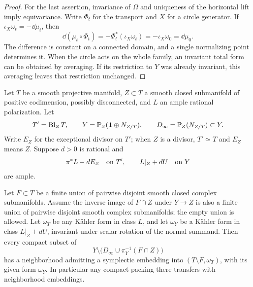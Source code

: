 \begin{proof}
For the last assertion, invariance of \(\Omega\) and uniqueness of
the horizontal lift imply equivariance. Write \(\Phi_t\) for the
transport and \(X\) for a circle generator. If
\(\iota_X\omega_t=-\dd\mu_t\), then
\[
 \dd(\mu_t\circ\Phi_t)
 =-\Phi_t^*(\iota_X\omega_t)
 =-\iota_X\omega_0
 =\dd\mu_0.
\]
The difference is constant on a connected domain, and a single
normalizing point determines it. When the circle acts on the
whole family, an invariant total form can be obtained by
averaging. If its restriction to \(Y\) was already invariant,
this averaging leaves that restriction unchanged.
\end{proof}

\begin{proposition}\label{geo:transfer}
Let \(T\) be a smooth projective manifold, \(Z\subset T\) a smooth
closed submanifold of positive codimension, possibly disconnected,
and \(L\) an ample
rational polarization. Let
\[
 T'=\operatorname{Bl}_ZT,\qquad
 Y=\mathbb P_Z(\mathbf1\oplus N_{Z/T}),\qquad
 D_\infty=\mathbb P_Z(N_{Z/T})\subset Y.
\]
Write \(E_Z\) for the exceptional divisor on \(T'\); when \(Z\) is
a divisor, \(T'\simeq T\) and \(E_Z\) means \(Z\).
Suppose \(d>0\) is rational and
\[
 \pi^*L-dE_Z\quad\hbox{on }T',
 \qquad L|_Z+dU\quad\hbox{on }Y
\]
are ample.

Let \(F\subset T\) be a finite union of pairwise disjoint smooth
closed complex submanifolds. Assume the inverse image of
\(F\cap Z\) under \(Y\to Z\) is also a finite union of pairwise
disjoint smooth complex submanifolds; the empty union is allowed.
Let \(\omega_T\) be any K\"ahler form in class \(L\), and let
\(\omega_Y\) be a K\"ahler form in class \(L|_Z+dU\), invariant
under scalar rotation of the normal summand.
Then every compact subset of
\[
 Y\setminus\bigl(D_\infty\cup\pi_Y^{-1}(F\cap Z)\bigr)
\]
has a neighborhood admitting a symplectic embedding into
\((T\setminus F,\omega_T)\), with its given form \(\omega_Y\).
In particular any compact packing there transfers with
neighborhood embeddings.
\end{proposition}

